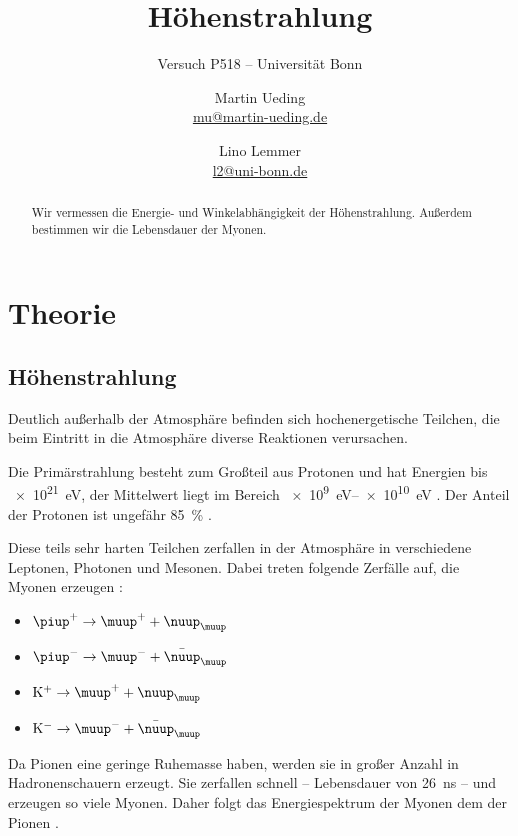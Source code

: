 \documentclass[11pt, ngerman, fleqn, DIV=15, headinclude, BCOR=2cm]{scrreprt}
\title{Höhenstrahlung}
\subtitle{Versuch P518 -- Universität Bonn}
\author{
    Martin Ueding \\
    \small{\href{mailto:mu@martin-ueding.de}{mu@martin-ueding.de}}
    \and
    Lino Lemmer \\
    \small{\href{mailto:l2@uni-bonn.de}{l2@uni-bonn.de}}
}
\date{\daterange{2014-07-02}{2014-07-03}}
\begin{document}
\maketitle

\begin{abstract}
    Wir vermessen die Energie- und Winkelabhängigkeit der Höhenstrahlung.
    Außerdem bestimmen wir die Lebensdauer der Myonen.
\end{abstract}

\tableofcontents

\chapter{Theorie}

\section{Höhenstrahlung}

Deutlich außerhalb der Atmosphäre befinden sich hochenergetische Teilchen, die
beim Eintritt in die Atmosphäre diverse Reaktionen verursachen.

Die Primärstrahlung besteht zum Großteil aus Protonen und hat Energien bis
\SI{e21}{\electronvolt}, der Mittelwert liegt im Bereich
\SIrange{e9}{e10}{\electronvolt} \parencite[983]{meschede-gerthsen_24}. Der
Anteil der Protonen ist ungefähr \SI{85}{\percent}
\parencite[110]{Grupen/Astroteilchenphysik}.

Diese teils sehr harten Teilchen zerfallen in der Atmosphäre in verschiedene
Leptonen, Photonen und Mesonen. Dabei treten folgende Zerfälle auf, die Myonen
erzeugen \parencite[111]{Grupen/Astroteilchenphysik}:

\label{sec:muon-channels}
\begin{itemize}
    \item
        $\piup^+ \to \muup^+ + \nuup_\muup$
    \item
        $\piup^- \to \muup^- + \bar \nuup_\muup$
    \item
        $\mathrm K^+ \to \muup^+ + \nuup_\muup$
    \item
        $\mathrm K^- \to \muup^- + \bar \nuup_\muup$
\end{itemize}

Da Pionen eine geringe Ruhemasse haben, werden sie in großer Anzahl in
Hadronenschauern erzeugt. Sie zerfallen schnell – Lebensdauer von
\SI{26}{\nano\second} \parencite[111]{Grupen/Astroteilchenphysik} – und
erzeugen so viele Myonen. Daher folgt das Energiespektrum der Myonen dem der
Pionen \parencite[113]{Grupen/Astroteilchenphysik}.
\end{document}
